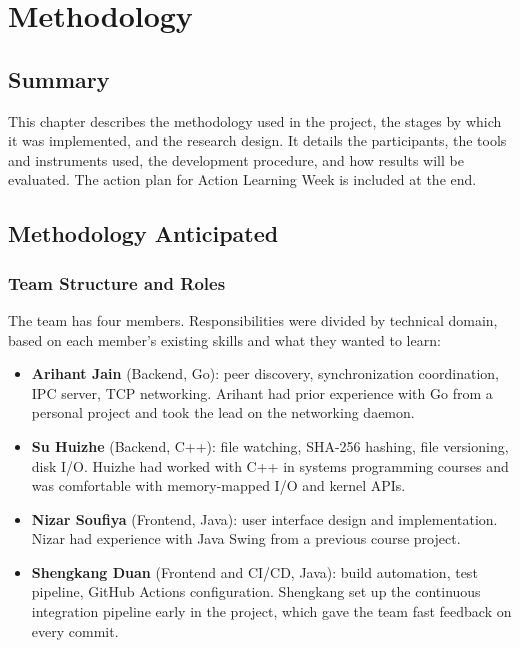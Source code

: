 \chapter{Methodology}

\section*{Summary}
This chapter describes the methodology used in the project, the stages by which it was implemented, and the research design. It details the participants, the tools and instruments used, the development procedure, and how results will be evaluated. The action plan for Action Learning Week is included at the end.

\section{Methodology Anticipated}
\label{sec:method-anticipated}

\subsection{Team Structure and Roles}

The team has four members. Responsibilities were divided by technical domain, based on each member's existing skills and what they wanted to learn:

\begin{itemize}
    \item \textbf{Arihant Jain} (Backend, Go): peer discovery, synchronization coordination, IPC server, TCP networking. Arihant had prior experience with Go from a personal project and took the lead on the networking daemon.
    \item \textbf{Su Huizhe} (Backend, C++): file watching, SHA-256 hashing, file versioning, disk I/O. Huizhe had worked with C++ in systems programming courses and was comfortable with memory-mapped I/O and kernel APIs.
    \item \textbf{Nizar Soufiya} (Frontend, Java): user interface design and implementation. Nizar had experience with Java Swing from a previous course project.
    \item \textbf{Shengkang Duan} (Frontend and CI/CD, Java): build automation, test pipeline, GitHub Actions configuration. Shengkang set up the continuous integration pipeline early in the project, which gave the team fast feedback on every commit.
\end{itemize}

